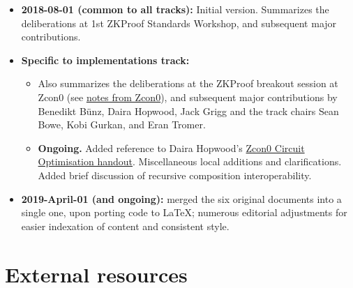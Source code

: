 \begin{itemize}[itemsep=1em]

\item \textbf{2018-08-01 (common to all tracks):} 
			Initial version. 
			Summarizes the deliberations at 1st ZKProof Standards Workshop, and subsequent major contributions.

\item \textbf{Specific to implementations track:}

			\begin{itemize}
				\item Also summarizes the deliberations at the ZKProof breakout session at Zcon0 
				(see \href{https://zkproof.org/zcon0_notes.pdf}{notes from Zcon0}), 
				and subsequent major contributions by 
				Benedikt Bünz, Daira Hopwood, Jack Grigg and the track chairs Sean Bowe, Kobi Gurkan, and Eran Tromer.

				\item \textbf{Ongoing.}
				Added reference to Daira Hopwood’s \href{https://docs.google.com/document/d/1aZ1GUAJOBFuqD4GOo9HqAH8w4xJo7HM4Bjte5-wkdnU/edit?usp=sharing}{Zcon0 Circuit Optimisation handout}. 
				Miscellaneous local additions and clarifications. 
				Added brief discussion of recursive composition interoperability.
			\end{itemize}

\item \textbf{2019-April-01 (and ongoing):} 
	merged the six original documents into a single one, upon porting code to LaTeX;
numerous editorial adjustments for easier indexation of content and consistent style.%

\end{itemize}




\section*{External resources}
\label{prelim:external-resources}

